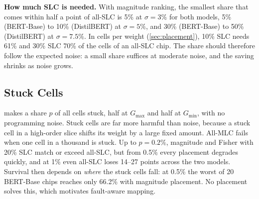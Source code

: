\begin{table}[t]
\centering\footnotesize
\caption{Paired difference to magnitude, in correctly classified sentences out of 872 (mean $\pm$
standard error over 100 chips per noise level, 300 overall).}\label{tab:paired}
\setlength{\tabcolsep}{2pt}
\end{table}

\textbf{How much SLC is needed.} With magnitude ranking, the smallest share that comes within half a
point of all-SLC is 5\% at $\sigma=3\%$ for both models, 5\% (BERT-Base) to 10\% (DistilBERT) at
$\sigma=5\%$, and 30\% (BERT-Base) to 50\% (DistilBERT) at $\sigma=7.5\%$. In cells per weight
(\cref{sec:placement}), 10\% SLC needs 61\% and 30\% SLC 70\% of the cells of an all-SLC chip. The share
should therefore follow the expected noise: a small share suffices at moderate noise, and the saving
shrinks as noise grows.

\subsection{Stuck Cells}
 makes a share $p$ of all cells stuck, half at $G_{\max}$ and half at $G_{\min}$, with no
programming noise. Stuck cells are far more harmful than noise, because a stuck cell in a high-order slice
shifts its weight by a large fixed amount. All-MLC fails when one cell in a thousand is stuck. Up to
$p=0.2\%$, magnitude and Fisher with 20\% SLC match or exceed all-SLC, but from 0.5\% every placement
degrades quickly, and at 1\% even all-SLC loses 14--27 points across the two models. Survival then depends
on \emph{where} the stuck cells fall: at 0.5\% the worst of 20 BERT-Base chips reaches only 66.2\% with
magnitude placement. No placement solves this, which motivates fault-aware mapping.

